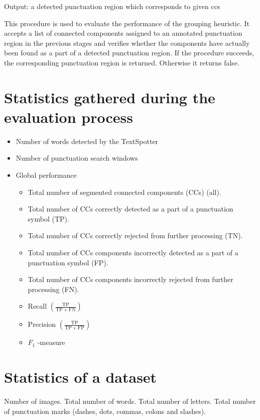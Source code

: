 \documentclass[12pt,a4paper]{report}
\begin{document}
Output: a detected punctuation region which corresponds to given ccs

This procedure is used to evaluate the performance of the grouping heuristic. It accepts a list of connected components assigned to an annotated punctuation region in the previous stages and verifies whether the components have actually been found as a part of a detected punctuation region. If the procedure succeeds, the corresponding punctuation region is returned. Otherwise it returns false.

\section{Statistics gathered during the evaluation process}
\begin{itemize}
    \item Number of words detected by the TextSpotter
    \item Number of punctuation search windows
    \item Global performance
    \begin{itemize}
        \item Total number of segmented connected components (CCs) (all).
        \item Total number of CCs correctly detected as a part of a punctuation symbol (TP).
        \item Total number of CCs correctly rejected from further processing (TN).
        \item Total number of CCs components incorrectly detected as a part of a punctuation symbol (FP).
        \item Total number of CCs components incorrectly rejected from further processing (FN).
        \item Recall $\left(\frac{\mathrm{TP}}{\mathrm{TP} + \mathrm{FN}}\right)$
        \item Precision $\left(\frac{\mathrm{TP}}{\mathrm{TP} + \mathrm{FP}}\right)$
        \item $F_{1}$ -measure
    \end{itemize}
\end{itemize}

\section{Statistics of a dataset}
Number of images. Total number of words. Total number of letters. Total number of punctuation marks (dashes, dots, commas, colons and slashes).
\end{document}
